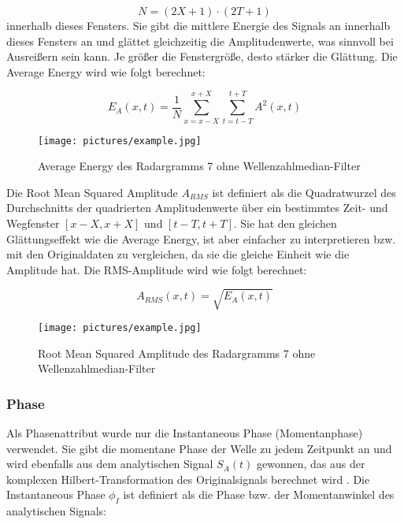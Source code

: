 \begin{equation}
    N = (2X+1) \cdot (2T+1)
\end{equation}
innerhalb dieses Fensters. Sie gibt die mittlere Energie des Signals an innerhalb dieses Fensters an und glättet gleichzeitig die Amplitudenwerte, was sinnvoll bei Ausreißern sein kann. Je größer die Fenstergröße, desto stärker die Glättung. Die Average Energy wird wie folgt berechnet:

\begin{equation}
    E_A(x,t) = \frac{1}{N} \sum_{x=x-X}^{x+X} \sum_{t=t-T}^{t+T} A^2(x,t)
\end{equation}

\begin{figure}[H]
    \centering
    \texttt{[image: pictures/example.jpg]}
    \caption{Average Energy des Radargramms 7 ohne Wellenzahlmedian-Filter}
    \label{fig:average_energy}
\end{figure}

Die Root Mean Squared Amplitude $A_{RMS}$ \parencites{roden_geologic_2015}{noauthor_rms_2022} ist definiert als die Quadratwurzel des Durchschnitts der quadrierten Amplitudenwerte über ein bestimmtes Zeit- und Wegfenster $\left[x-X, x+X\right]$ und $\left[t-T, t+T\right]$. Sie hat den gleichen Glättungseffekt wie die Average Energy, ist aber einfacher zu interpretieren bzw. mit den Originaldaten zu vergleichen, da sie die gleiche Einheit wie die Amplitude hat. Die RMS-Amplitude wird wie folgt berechnet:

\begin{equation}
    A_{RMS}(x,t) = \sqrt{E_A(x,t)}
\end{equation}

\begin{figure}[H]
    \centering
    \texttt{[image: pictures/example.jpg]}
    \caption{Root Mean Squared Amplitude des Radargramms 7 ohne Wellenzahlmedian-Filter}
    \label{fig:rms_amplitude}
\end{figure}

\subsubsection{Phase}

Als Phasenattribut wurde nur die Instantaneous Phase (Momentanphase) \parencite{taner_complex_1979} verwendet. Sie gibt die momentane Phase der Welle zu jedem Zeitpunkt an und wird ebenfalls aus dem analytischen Signal $S_A(t)$ gewonnen, das aus der komplexen Hilbert-Transformation des Originalsignals berechnet wird \parencite[S. 177]{sheriff_encyclopedic_2002}. Die Instantaneous Phase $\phi_I$ ist definiert als die Phase bzw. der Momentanwinkel des analytischen Signals:

